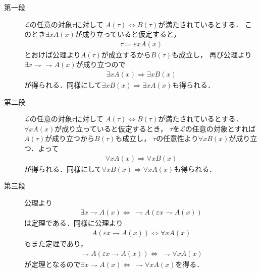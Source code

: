 	\begin{prf}\mbox{}
		\begin{description}
			\item[第一段]
				$\mathcal{L}$の任意の対象$\tau$に対して
				$A(\tau) \Longleftrightarrow B(\tau)$が満たされているとする．
				このとき$\exists x A(x)$が成り立っていると仮定すると，
				\begin{align}
					\tau \coloneqq \varepsilon x A(x)
				\end{align}
				とおけば公理より$A(\tau)$が成立するから$B(\tau)$も成立し，
				再び公理より$\exists x \rightharpoondown \rightharpoondown A(x)$が成り立つので
				\begin{align}
					\exists x A(x) \Longrightarrow \exists x B(x)
				\end{align}
				が得られる．同様にして$\exists x B(x) \Longrightarrow \exists x A(x)$も得られる．
				
			\item[第二段]
				$\mathcal{L}$の任意の対象$\tau$に対して
				$A(\tau) \Longleftrightarrow B(\tau)$が満たされているとする．
				$\forall x A(x)$が成り立っていると仮定するとき，
				$\tau$を$\mathcal{L}$の任意の対象とすれば$A(\tau)$が成り立つから$B(\tau)$も成立し，
				$\tau$の任意性より$\forall x B(x)$が成り立つ．よって
				\begin{align}
					\forall x A(x) \Longrightarrow \forall x B(x)
				\end{align}
				が得られる．同様にして$\forall x B(x) \Longrightarrow \forall x A(x)$も得られる．
				
			\item[第三段]
				公理より
				\begin{align}
					\exists x \rightharpoondown A(x) \Longleftrightarrow\ 
					\rightharpoondown A(\varepsilon x \rightharpoondown A(x))
				\end{align}
				は定理である．同様に公理より
				\begin{align}
					A(\varepsilon x \rightharpoondown A(x)) \Longleftrightarrow \forall x A(x) 
				\end{align}
				もまた定理であり，
				\begin{align}
					\rightharpoondown A(\varepsilon x \rightharpoondown A(x)) \Longleftrightarrow\ 
					\rightharpoondown \forall x A(x)
				\end{align}
				が定理となるので$\exists x \rightharpoondown A(x) \Longleftrightarrow\ \rightharpoondown \forall x A(x)$を得る．
			

\end{description}
\end{prf}
